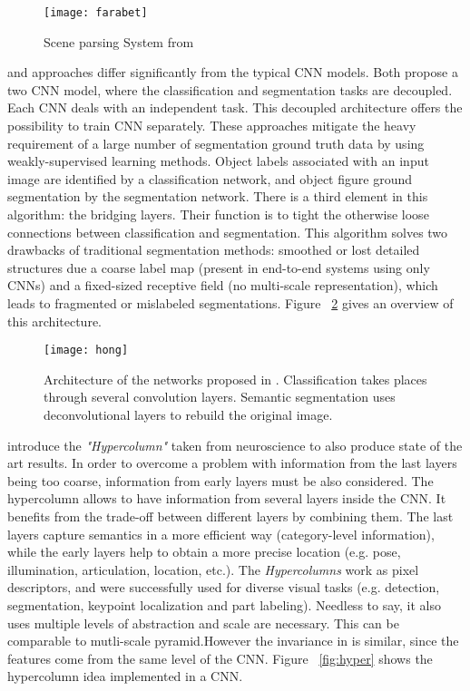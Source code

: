 \begin{figure}
 \centering
 \texttt{[image: farabet]}
 \caption{Scene parsing System from \textcite{farabet2013pami}}
 \label{fig:farabet}
\end{figure}   

\textcite{hong2015decoupled} and \textcite{noh2015learning} approaches differ significantly from the typical CNN models. Both propose a two CNN model, where the classification and segmentation tasks are decoupled. Each CNN deals with an independent task. This decoupled architecture offers the possibility to train CNN separately. These approaches mitigate the heavy requirement of a large number of segmentation ground truth data by using weakly-supervised learning methods. Object labels associated with an input image are identified by a classification network, and object figure ground segmentation by the segmentation network. There is a third element in this algorithm: the bridging layers. Their function is to tight the otherwise loose connections between classification and segmentation. This algorithm solves two drawbacks of traditional segmentation methods: smoothed or lost detailed structures due a coarse label map (present in end-to-end systems using only CNNs)  and a fixed-sized receptive field (no multi-scale representation), which leads to fragmented or mislabeled segmentations. Figure ~\ref{fig:hong} gives an overview of this architecture. 

\begin{figure}
 \centering
 \texttt{[image: hong]}
 \caption{Architecture of the networks proposed in \textcite{hong2015decoupled}. Classification takes places through several convolution layers. Semantic segmentation uses deconvolutional layers to rebuild the original image.}
 \label{fig:hong}
\end{figure}

\textcite{hariharan2014hypercolumns} introduce the \textit{"Hypercolumn"} taken from neuroscience to also produce state of the art results. In order to overcome a problem with information from the last layers being too coarse, information from early layers must be also considered.  The hypercolumn allows to have information from several layers inside the CNN. It benefits from the trade-off between different layers by combining them. The last layers capture semantics in a more efficient way (category-level information), while the early layers help to obtain a more precise location (e.g. pose, illumination, articulation, location, etc.). The \textit{Hypercolumns} work as pixel descriptors, and were successfully used for diverse visual tasks (e.g. detection, segmentation, keypoint localization and part labeling).
Needless to say, it also uses multiple levels of abstraction and scale are necessary. This can be comparable to \textcite{farabet2013pami} mutli-scale pyramid.However the invariance in is similar, since the features come from the same level of the CNN. Figure ~\ref{fig:hyper} shows the hypercolumn idea implemented in a CNN. 

